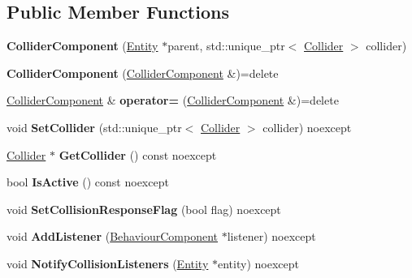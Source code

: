 \subsection*{Public Member Functions}
\begin{DoxyCompactItemize}
\item 
\mbox{\label{class_blade_1_1_collider_component_a00da11e1d8b4035d389d738dd33d2331}} 
{\bfseries Collider\+Component} (\hyperlink{class_blade_1_1_entity}{Entity} $\ast$parent, std\+::unique\+\_\+ptr$<$ \hyperlink{class_blade_1_1_collider}{Collider} $>$ collider)
\item 
\mbox{\label{class_blade_1_1_collider_component_a66647067a95a32e362ade6c7f61718b6}} 
{\bfseries Collider\+Component} (\hyperlink{class_blade_1_1_collider_component}{Collider\+Component} \&)=delete
\item 
\mbox{\label{class_blade_1_1_collider_component_a761be8a3fcb1f25bf834006ba4903c73}} 
\hyperlink{class_blade_1_1_collider_component}{Collider\+Component} \& {\bfseries operator=} (\hyperlink{class_blade_1_1_collider_component}{Collider\+Component} \&)=delete
\item 
\mbox{\label{class_blade_1_1_collider_component_a963645ea85df676a53331ee73fb8c1be}} 
void {\bfseries Set\+Collider} (std\+::unique\+\_\+ptr$<$ \hyperlink{class_blade_1_1_collider}{Collider} $>$ collider) noexcept
\item 
\mbox{\label{class_blade_1_1_collider_component_a12849cf36520371d006e008eed2afab5}} 
\hyperlink{class_blade_1_1_collider}{Collider} $\ast$ {\bfseries Get\+Collider} () const noexcept
\item 
\mbox{\label{class_blade_1_1_collider_component_a3bad0a0380c3738311ccce2471ff2bfc}} 
bool {\bfseries Is\+Active} () const noexcept
\item 
\mbox{\label{class_blade_1_1_collider_component_a87d47d39580a943564fdc5dc8b909efa}} 
void {\bfseries Set\+Collision\+Response\+Flag} (bool flag) noexcept
\item 
\mbox{\label{class_blade_1_1_collider_component_a02858894d052b92d17224a55c9be5934}} 
void {\bfseries Add\+Listener} (\hyperlink{class_blade_1_1_behaviour_component}{Behaviour\+Component} $\ast$listener) noexcept
\item 
\mbox{\label{class_blade_1_1_collider_component_ad7507d81243c8dd2933bebb8962d69b2}} 
void {\bfseries Notify\+Collision\+Listeners} (\hyperlink{class_blade_1_1_entity}{Entity} $\ast$entity) noexcept
\end{DoxyCompactItemize}


